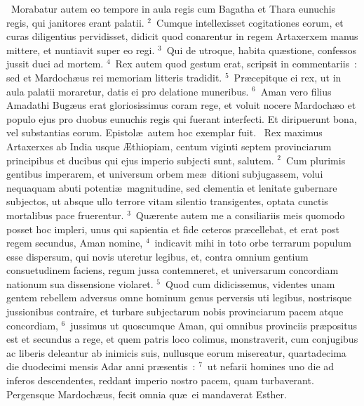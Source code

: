 ~Morabatur autem eo tempore in aula regis cum Bagatha et Thara eunuchis regis, qui janitores erant palatii.
${}^{2}$~Cumque intellexisset cogitationes eorum, et curas diligentius pervidisset, didicit quod conarentur in regem Artaxerxem manus mittere, et nuntiavit super eo regi.
${}^{3}$~Qui de utroque, habita qu\ae stione, confessos jussit duci ad mortem.
${}^{4}$~Rex autem quod gestum erat, scripsit in commentariis~: sed et Mardoch\ae us rei memoriam litteris tradidit.
${}^{5}$~Pr\ae cepitque ei rex, ut in aula palatii moraretur, datis ei pro delatione muneribus.
${}^{6}$~Aman vero filius Amadathi Bug\ae us erat gloriosissimus coram rege, et voluit nocere Mardoch\ae o et populo ejus pro duobus eunuchis regis qui fuerant interfecti. Et diripuerunt bona, vel substantias eorum. Epistol\ae\ autem hoc exemplar fuit.
~Rex maximus Artaxerxes ab India usque \AE thiopiam, centum viginti septem provinciarum principibus et ducibus qui ejus imperio subjecti sunt, salutem.
${}^{2}$~Cum plurimis gentibus imperarem, et universum orbem me\ae\ ditioni subjugassem, volui nequaquam abuti potenti\ae\ magnitudine, sed clementia et lenitate gubernare subjectos, ut absque ullo terrore vitam silentio transigentes, optata cunctis mortalibus pace fruerentur.
${}^{3}$~Qu\ae rente autem me a consiliariis meis quomodo posset hoc impleri, unus qui sapientia et fide ceteros pr\ae cellebat, et erat post regem secundus, Aman nomine,
${}^{4}$~indicavit mihi in toto orbe terrarum populum esse dispersum, qui novis uteretur legibus, et, contra omnium gentium consuetudinem faciens, regum jussa contemneret, et universarum concordiam nationum sua dissensione violaret.
${}^{5}$~Quod cum didicissemus, videntes unam gentem rebellem adversus omne hominum genus perversis uti legibus, nostrisque jussionibus contraire, et turbare subjectarum nobis provinciarum pacem atque concordiam,
${}^{6}$~jussimus ut quoscumque Aman, qui omnibus provinciis pr\ae positus est et secundus a rege, et quem patris loco colimus, monstraverit, cum conjugibus ac liberis deleantur ab inimicis suis, nullusque eorum misereatur, quartadecima die duodecimi mensis Adar anni pr\ae sentis~:
${}^{7}$~ut nefarii homines uno die ad inferos descendentes, reddant imperio nostro pacem, quam turbaverant. Pergensque Mardoch\ae us, fecit omnia qu\ae\ ei mandaverat Esther.


